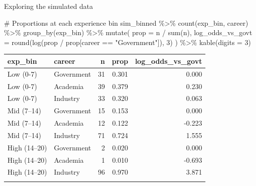 \documentclass[
  ignorenonframetext,
]{beamer}
\newenvironment{Shaded}{\begin{snugshade}}{\end{snugshade}}
\newcommand{\AttributeTok}[1]{\textcolor[rgb]{0.40,0.45,0.13}{#1}}
\newcommand{\CommentTok}[1]{\textcolor[rgb]{0.37,0.37,0.37}{#1}}
\newcommand{\DecValTok}[1]{\textcolor[rgb]{0.68,0.00,0.00}{#1}}
\newcommand{\FunctionTok}[1]{\textcolor[rgb]{0.28,0.35,0.67}{#1}}
\newcommand{\NormalTok}[1]{\textcolor[rgb]{0.00,0.23,0.31}{#1}}
\newcommand{\SpecialCharTok}[1]{\textcolor[rgb]{0.37,0.37,0.37}{#1}}
\newcommand{\StringTok}[1]{\textcolor[rgb]{0.13,0.47,0.30}{#1}}
\begin{document}
\begin{frame}[fragile]{Exploring the simulated data}
\label{exploring-the-simulated-data}
\begin{Shaded}
\begin{Highlighting}[]
\CommentTok{\# Proportions at each experience bin}
\NormalTok{sim\_binned }\SpecialCharTok{\%\textgreater{}\%}
  \FunctionTok{count}\NormalTok{(exp\_bin, career) }\SpecialCharTok{\%\textgreater{}\%}
  \FunctionTok{group\_by}\NormalTok{(exp\_bin) }\SpecialCharTok{\%\textgreater{}\%}
  \FunctionTok{mutate}\NormalTok{(}
    \AttributeTok{prop =}\NormalTok{ n }\SpecialCharTok{/} \FunctionTok{sum}\NormalTok{(n),}
    \AttributeTok{log\_odds\_vs\_govt =} \FunctionTok{round}\NormalTok{(}\FunctionTok{log}\NormalTok{(prop }\SpecialCharTok{/}\NormalTok{ prop[career }\SpecialCharTok{==} \StringTok{"Government"}\NormalTok{]), }\DecValTok{3}\NormalTok{)}
\NormalTok{  ) }\SpecialCharTok{\%\textgreater{}\%}
  \FunctionTok{kable}\NormalTok{(}\AttributeTok{digits =} \DecValTok{3}\NormalTok{)}
\end{Highlighting}
\end{Shaded}

\begin{longtable}[]{@{}llrrr@{}}
\toprule\noalign{}
exp\_bin & career & n & prop & log\_odds\_vs\_govt \\
\midrule\noalign{}
\endhead
Low (0-7) & Government & 31 & 0.301 & 0.000 \\
Low (0-7) & Academia & 39 & 0.379 & 0.230 \\
Low (0-7) & Industry & 33 & 0.320 & 0.063 \\
Mid (7--14) & Government & 15 & 0.153 & 0.000 \\
Mid (7--14) & Academia & 12 & 0.122 & -0.223 \\
Mid (7--14) & Industry & 71 & 0.724 & 1.555 \\
High (14--20) & Government & 2 & 0.020 & 0.000 \\
High (14--20) & Academia & 1 & 0.010 & -0.693 \\
High (14--20) & Industry & 96 & 0.970 & 3.871 \\
\bottomrule\noalign{}
\end{longtable}

\end{frame}
\end{document}
